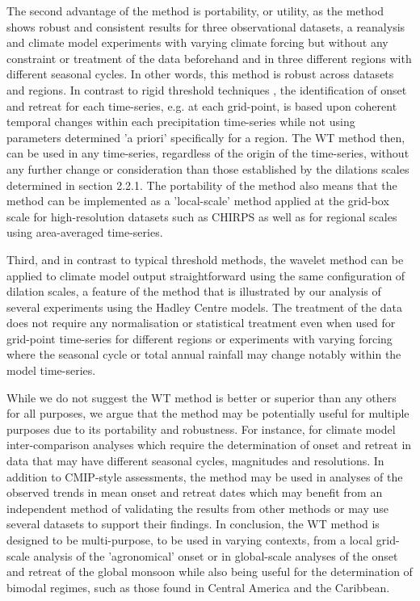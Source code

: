 The second advantage of the method is portability, or utility, as the method shows robust and consistent results for three observational datasets, a reanalysis and climate model experiments with varying climate forcing but without any constraint or treatment of the data beforehand and in three different regions with different seasonal cycles. In other words, this method is robust across datasets and regions. In contrast to rigid threshold techniques \citep[e.g.][]{liebmann2001interannual}, the identification of onset and retreat for each time-series, e.g. at each grid-point, is based upon coherent temporal changes within each precipitation time-series while not using parameters determined 'a priori' specifically for a region. The WT method then, can be used in any time-series, regardless of the origin of the time-series, without any further change or consideration than those established by the dilations scales determined in section 2.2.1. 
The portability of the method also means that the method can be implemented as a 'local-scale' method applied at the grid-box scale for high-resolution datasets such as CHIRPS as well as for regional scales using area-averaged time-series.

Third, and in contrast to typical threshold methods, the wavelet method can be applied to climate model output straightforward using the same configuration of dilation scales, a feature of the method that is illustrated by our analysis of several experiments using the Hadley Centre models. The treatment of the data does not require  any normalisation or statistical treatment even when used for grid-point time-series for different regions or experiments with varying forcing where the seasonal cycle or total annual rainfall may change notably within the model time-series.



While we do not suggest the WT method is better or superior than any others for all purposes, we argue that the method may be potentially useful for multiple purposes due to its portability and robustness. For instance, for climate model inter-comparison analyses which require the determination of onset and retreat in data that may have different seasonal cycles, magnitudes and resolutions.  In addition to CMIP-style assessments, the method may be used in analyses of the observed trends in mean onset and retreat dates which may benefit from an independent method of validating the results from other methods or may use several datasets to support their findings.
In conclusion, the WT method is designed to be multi-purpose, to be used in varying contexts, from a local grid-scale analysis of the 'agronomical' onset or in global-scale analyses of the onset and retreat of the global monsoon while also being useful for the determination of bimodal regimes, such as those found in Central America and the Caribbean.  